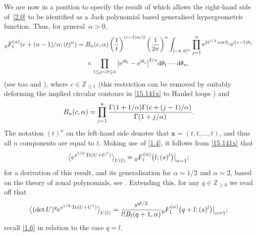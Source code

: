 \documentclass[pdftex]{sigma}
\numberwithin{equation}{section}
\theoremstyle{definition}
\begin{document}
We are now in a position to specify the result of \cite{Fo93c} which allows
the right-hand side of~\eqref{2.0} to be identified
as a Jack polynomial based generalised hypergeometric function. Thus, for general~${\alpha > 0}$,
\begin{align}
{\vphantom{F}}_0^{\mathstrut} F_1^{(\alpha)}(c + (n - 1)/\alpha;(t)^n)
={}& B_n(c,\alpha) \left ( {1 \over t} \right )^{(c-1)n/2}\left ( {1 \over 2 \pi } \right )^n \int_{[-\pi,\pi]^n} \prod_{j=1}^n
{\rm e}^{2t^{1/2} \cos \theta_j} {\rm e}^{{\rm i} (c-1) \theta_j}
\nonumber \\
&
\times \prod_{1 \le j < k \le n}
\big|{\rm e}^{{\rm i} \theta_k} - {\rm e}^{{\rm i} \theta_j} \big|^{2/\alpha} {\rm d}\theta_1 \cdots {\rm d}\theta_n,\label{15.141x}
\end{align}
(see too \cite[equation~(13.27)]{Fo10} and \cite[equation~(4.32)]{Fo25}),
where $c \in \mathbb Z_{\ge 1}$ (this restriction can be removed by suitably deforming the implied circular contours in \eqref{15.141x} to Hankel loops \cite[proof of Proposition~2]{Fo13}) and
\[%
B_n(c,\alpha) = \prod_{j=1}^n {\Gamma(1 + 1/\alpha) \Gamma(c + (j-1)/\alpha)
\over \Gamma(1 + j/\alpha) }.
\]
The notation $(t)^n$ on the left-hand side denotes that $\mathbf x = (t,t,\dots,t)$, and thus all $n$ components are equal to $t$.
Making use of \eqref{1.4}, it follows from \eqref{15.141x} that
\begin{equation}\label{2.8}
\big \langle {\rm e}^{s^{1/2} \operatorname{Tr}(U + U^\dagger)} \big \rangle_{U(l)} =
{\vphantom{F}}_0^{\mathstrut} F_1^{(\alpha)}\bigl(l;(s)^l\bigr) \big |_{\alpha = 1};
\end{equation}
for a derivation of this result, and its generalisation for $\alpha=1/2$ and $\alpha = 2$, based on the theory of zonal polynomials, see \cite{FR09}. Extending this, for any $q \in \mathbb Z_{\ge 0}$ we read off that
\begin{equation}\label{2.8a}
\big \langle (\det U)^q {\rm e}^{s^{1/2} \operatorname{Tr}(U + U^\dagger)} \big \rangle_{U(l)} =
{s^{q l/2} \over l! B_l(q+1,\alpha)}
{\vphantom{F}}_0^{\mathstrut} F_1^{(\alpha)}\bigl(q+l;(s)^l\bigr) \big |_{\alpha = 1};
\end{equation}
recall \eqref{1.6} in relation to the case $q=l$.
\end{document}
